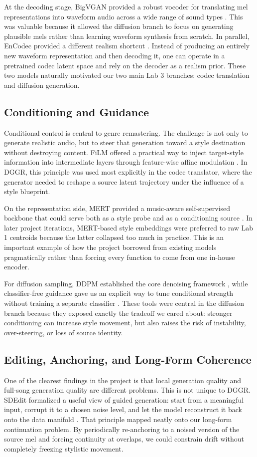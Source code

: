 \documentclass[conference]{IEEEtran}
\begin{document}
At the decoding stage, BigVGAN provided a robust vocoder for translating mel representations into waveform audio across a wide range of sound types \cite{bigvgan2023}. This was valuable because it allowed the diffusion branch to focus on generating plausible mels rather than learning waveform synthesis from scratch. In parallel, EnCodec provided a different realism shortcut \cite{encodec2023}. Instead of producing an entirely new waveform representation and then decoding it, one can operate in a pretrained codec latent space and rely on the decoder as a realism prior. These two models naturally motivated our two main Lab 3 branches: codec translation and diffusion generation.

\subsection{Conditioning and Guidance}
Conditional control is central to genre remastering. The challenge is not only to generate realistic audio, but to steer that generation toward a style destination without destroying content. FiLM offered a practical way to inject target-style information into intermediate layers through feature-wise affine modulation \cite{film2018}. In DGGR, this principle was used most explicitly in the codec translator, where the generator needed to reshape a source latent trajectory under the influence of a style blueprint.

On the representation side, MERT provided a music-aware self-supervised backbone that could serve both as a style probe and as a conditioning source \cite{mert2023}. In later project iterations, MERT-based style embeddings were preferred to raw Lab 1 centroids because the latter collapsed too much in practice. This is an important example of how the project borrowed from existing models pragmatically rather than forcing every function to come from one in-house encoder.

For diffusion sampling, DDPM established the core denoising framework \cite{ddpm2020}, while classifier-free guidance gave us an explicit way to tune conditional strength without training a separate classifier \cite{cfg2021}. These tools were central in the diffusion branch because they exposed exactly the tradeoff we cared about: stronger conditioning can increase style movement, but also raises the risk of instability, over-steering, or loss of source identity.

\subsection{Editing, Anchoring, and Long-Form Coherence}
One of the clearest findings in the project is that local generation quality and full-song generation quality are different problems. This is not unique to DGGR. SDEdit formalized a useful view of guided generation: start from a meaningful input, corrupt it to a chosen noise level, and let the model reconstruct it back onto the data manifold \cite{sdedit2022}. That principle mapped neatly onto our long-form continuation problem. By periodically re-anchoring to a noised version of the source mel and forcing continuity at overlaps, we could constrain drift without completely freezing stylistic movement.
\end{document}
